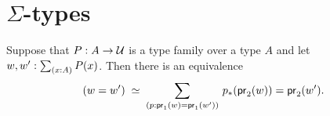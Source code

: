 \documentclass[hott-all.tex]{subfiles}
\begin{document}
\section{\texorpdfstring{$\Sigma$}{Σ}-types}
\label{sec:compute-sigma}

%
%
%
%
%
\begin{thm}\label{thm:path-sigma}
Suppose that $P:A\to\mathcal{U}$ is a type family over a type $A$ and let $w,w':\sm{x:A}P(x)$. Then there is an equivalence
\begin{equation*}
\eqvspaced{(w=w')}{\dsm{p:\proj{1}(w)=\proj{1}(w')} \trans{p}{\proj{2}(w)}=\proj{2}(w')}.
\end{equation*}
\end{thm}
\end{document}
